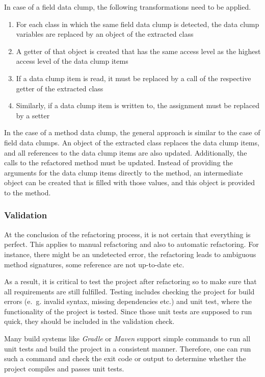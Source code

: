 In case of a field data clump, the following transformations need to be applied.

\begin{enumerate}
    \item For each class in which the same field data clump is detected, the data clump variables are replaced by an object of the extracted class
    \item A getter of that object is created that has the same access level as the highest access level of the data clump items
    \item If a data clump item is read, it must be replaced by a call of the respective getter of the extracted class
    \item Similarly, if a data clump item is written to, the assignment must be replaced by a setter
\end{enumerate}



In the case of a method data clump, the general approach is similar to the case of field data clumps. An object of the extracted class replaces the data clump items, and all references to the data clump items are also updated. Additionally, the calls to the refactored method must be updated. Instead of providing the arguments for the data clump items directly to the method, an intermediate object can be created that is filled with those values, and this object is provided to the method. 

\subsubsection{Validation}

At the conclusion of the refactoring process, it is not certain that everything is perfect. This applies to manual refactoring and also to automatic refactoring. For instance, there might be an undetected error, the refactoring leads to ambiguous method signatures, some reference are not up-to-date etc.

As a result, it is critical to test the project after refactoring so to make sure that all requirements are still fulfilled. Testing includes checking the project for build errors (e.~g. invalid syntax, missing dependencies etc.) and unit test, where the functionality of the project is tested. Since those unit tests are supposed to run quick, they should be included in the validation check. 

Many build systems like \textit{Gradle} or \textit{Maven} support simple commands to run all unit tests and build the project in a consistent manner.  Therefore, one can run such a command and check the exit code or output to determine whether the project compiles and passes unit tests.

